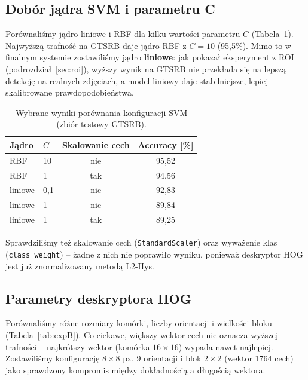\documentclass[12pt,oneside]{article}
\begin{document}
\subsection{Dobór jądra SVM i parametru C}
Porównaliśmy jądro liniowe i RBF dla kilku wartości parametru $C$
(Tabela~\ref{tab:expA}). Najwyższą trafność na GTSRB daje jądro RBF z $C=10$
(95,5\%). Mimo to w finalnym systemie zostawiliśmy jądro \textbf{liniowe}: jak
pokazał eksperyment z ROI (podrozdział~\ref{sec:roi}), wyższy wynik na GTSRB nie
przekłada się na lepszą detekcję na realnych zdjęciach, a model liniowy daje
stabilniejsze, lepiej skalibrowane prawdopodobieństwa.

\begin{table}[H]
\centering
\begin{tabular}{llcc}
    \toprule
    Jądro & $C$ & Skalowanie cech & Accuracy [\%] \\
    \midrule
    RBF     & 10  & nie & 95,52 \\
    RBF     & 1   & tak & 94,56 \\
    liniowe & 0,1 & nie & 92,83 \\
    liniowe & 1   & nie & 89,84 \\
    liniowe & 1   & tak & 89,25 \\
    \bottomrule
\end{tabular}
\caption{Wybrane wyniki porównania konfiguracji SVM (zbiór testowy GTSRB).}
\label{tab:expA}
\end{table}

Sprawdziliśmy też skalowanie cech (\texttt{StandardScaler}) oraz wyważenie klas
(\texttt{class\_weight}) -- żadne z nich nie poprawiło wyniku, ponieważ deskryptor
HOG jest już znormalizowany metodą L2-Hys.

\subsection{Parametry deskryptora HOG}
Porównaliśmy różne rozmiary komórki, liczby orientacji i wielkości bloku
(Tabela~\ref{tab:expB}). Co ciekawe, większy wektor cech nie oznacza wyższej
trafności -- najkrótszy wektor (komórka $16\times16$) wypada nawet najlepiej.
Zostawiliśmy konfigurację $8\times8$ px, 9 orientacji i blok $2\times2$ (wektor
1764 cech) jako sprawdzony kompromis między dokładnością a długością wektora.
\end{document}
